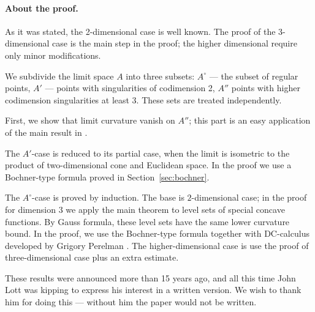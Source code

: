 \paragraph{About the proof.}
As it was stated, the 2-dimensional case is well known.
The proof of the 3-dimensional case is the main step in the proof;
the higher dimensional require only minor modifications.

We subdivide the limit space $A$ into
three subsets: $A^\circ$ --- the subset of regular 
points, $A'$ --- points with singularities of codimension 2,
$A''$ points with higher codimension singularities at least 3.
These sets are treated independently.

First, we show that limit curvature vanish on $A''$; 
this part is an easy application of the main result in \cite{petrunin-SC}.

The $A'$-case is reduced to its partial case, when the limit is isometric to the product of two-dimensional cone and Euclidean space.
In the proof we use a Bochner-type formula proved in Section~\ref{sec:bochner}.

The $A^\circ$-case is proved by induction.
The base is $2$-dimensional case; in the proof for dimension $3$ we apply the main theorem to level sets of special concave functions.
By Gauss formula, these level sets have the same lower curvature bound. 
In the proof, we use the Bochner-type formula together with DC-calculus developed by Grigory Perelman \cite{PerDC}.
The higher-dimensional case is use the proof of three-dimensional case plus an extra estimate.

These results were announced more than 15 years ago, and all this time John Lott was kipping to express his interest in a written version.
We wish to thank him for doing this --- without him the paper would not be written. 